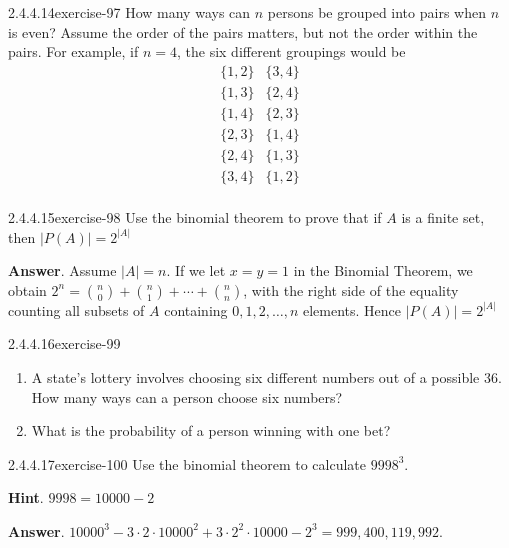 \documentclass[twoside,10pt,]{book}
\numberwithin{equation}{section}
\begin{document}
\begin{divisionsolution}{2.4.4.14}{}{exercise-97}%
\hypertarget{p-841}{}%
How many ways can \(n\)  persons be grouped into pairs when \(n\)  is even? Assume the order of the pairs matters, but not the order within the pairs. For example, if \(n=4\), the six different groupings would be%
\begin{equation*}
\begin{array}{cc}
\{1,2\} & \{3,4\} \\
\{1,3\} & \{2,4\} \\
\{1,4\} & \{2,3\} \\
\{2,3\} & \{1,4\} \\
\{2,4\} & \{1,3\} \\
\{3,4\} & \{1,2\} \\
\end{array}
\end{equation*}
%
\end{divisionsolution}%
\begin{divisionsolution}{2.4.4.15}{}{exercise-98}%
\hypertarget{p-842}{}%
Use the binomial theorem to prove that if \(A\) is a finite set, then \(\lvert P(A)\rvert =2^{\lvert A  \rvert}\)%
\par\smallskip%
\noindent\textbf{Answer}.\quad%
\hypertarget{p-843}{}%
Assume \(\lvert A \rvert =n\).  If we let \(x=y=1\) in the Binomial Theorem, we obtain \(2^n=\binom{n}{0}+\binom{n}{1}+\cdots +\binom{n}{n}\), with the right side of the equality counting all subsets of \(A\) containing \(0, 1, 2, \dots , n\) elements.  Hence \(\lvert P(A)\rvert =2^{\lvert A  \rvert}\)%
\end{divisionsolution}%
\begin{divisionsolution}{2.4.4.16}{}{exercise-99}%
\hypertarget{p-844}{}%
\leavevmode%
\begin{enumerate}[label=(\alph*)]
\item\hypertarget{li-473}{}\hypertarget{p-845}{}%
A state's lottery involves choosing six different numbers out of a possible 36. How many ways can a person choose six numbers?%
\item\hypertarget{li-474}{}\hypertarget{p-846}{}%
What is the probability of a person winning with one bet?%
\end{enumerate}
%
\end{divisionsolution}%
\begin{divisionsolution}{2.4.4.17}{}{exercise-100}%
\hypertarget{p-847}{}%
Use the binomial theorem to calculate \(9998^3\).%
\par\smallskip%
\noindent\textbf{Hint}.\quad%
\hypertarget{p-848}{}%
\(9998 = 10000-2\)%
\par\smallskip%
\noindent\textbf{Answer}.\quad%
\hypertarget{p-849}{}%
\(10000^3 - 3 \cdot 2 \cdot 10000^2 +3 \cdot 2^2 \cdot 10000 - 2^3 = 999,400,119,992.\)%
\end{divisionsolution}%
\end{document}
